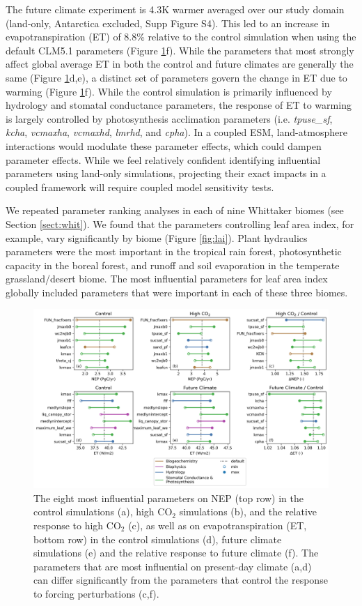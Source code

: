 \documentclass[draft]{agujournal2019}
\begin{document}
The future climate experiment is 4.3K warmer averaged over our study domain (land-only, Antarctica excluded, Supp Figure S4). This led to an increase in evapotranspiration (ET) of 8.8\% relative to the control simulation when using the default CLM5.1 parameters (Figure \ref{fig:nep}f). While the parameters that most strongly affect global average ET in both the control and future climates are generally the same (Figure \ref{fig:nep}d,e), a distinct set of parameters govern the change in ET due to warming (Figure \ref{fig:nep}f). While the control simulation is primarily influenced by hydrology and stomatal conductance parameters, the response of ET to warming is largely controlled by photosynthesis acclimation parameters (i.e. \textit{tpuse\_sf}, \textit{kcha}, \textit{vcmaxha}, \textit{vcmaxhd}, \textit{lmrhd}, and \textit{cpha}). In a coupled ESM, land-atmosphere interactions would modulate these parameter effects, which could dampen parameter effects. While we feel relatively confident identifying influential parameters using land-only simulations, projecting their exact impacts in a coupled framework will require coupled model sensitivity tests.

We repeated parameter ranking analyses in each of nine Whittaker biomes (see Section \ref{sect:whit}). We found that the parameters controlling leaf area index, for example, vary significantly by biome (Figure \ref{fig:lai}). Plant hydraulics parameters were the most important in the tropical rain forest, photosynthetic capacity in the boreal forest, and runoff and soil evaporation in the temperate grassland/desert biome. The most influential parameters for leaf area index globally included parameters that were important in each of these three biomes. 

\begin{figure}[h]
\centering
\includegraphics[width=\textwidth]{../figs/main/deltas.png}
\caption{The eight most influential parameters on NEP (top row) in the control simulations (a), high CO$_2$ simulations (b), and the relative response to high CO$_2$ (c), as well as on evapotranspiration (ET, bottom row) in the control simulations (d), future climate simulations (e) and the relative response to future climate (f). The parameters that are most influential on present-day climate (a,d) can differ significantly from the parameters that control the response to forcing perturbations (c,f).}
\label{fig:nep}
\end{figure}
\end{document}
